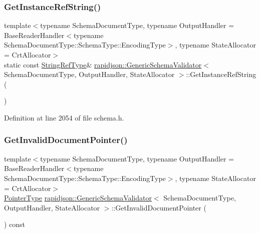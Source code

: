 \subsubsection{\texorpdfstring{GetInstanceRefString()}{GetInstanceRefString()}}
{\footnotesize\ttfamily template$<$typename Schema\+Document\+Type, typename Output\+Handler = Base\+Reader\+Handler$<$typename Schema\+Document\+Type\+::\+Schema\+Type\+::\+Encoding\+Type$>$, typename State\+Allocator = Crt\+Allocator$>$ \\
static const \mbox{\hyperlink{classrapidjson_1_1_generic_schema_validator_af6d33bab73e771af8c06f2b05e878350}{String\+Ref\+Type}}\& \mbox{\hyperlink{classrapidjson_1_1_generic_schema_validator}{rapidjson\+::\+Generic\+Schema\+Validator}}$<$ Schema\+Document\+Type, Output\+Handler, State\+Allocator $>$\+::Get\+Instance\+Ref\+String (\begin{DoxyParamCaption}{ }\end{DoxyParamCaption})\hspace{0.3cm}{\ttfamily [static]}}



Definition at line 2054 of file schema.\+h.

\mbox{\label{classrapidjson_1_1_generic_schema_validator_a60dfb4a89593c8d3ca4c89a6202feb52}} 
\subsubsection{\texorpdfstring{GetInvalidDocumentPointer()}{GetInvalidDocumentPointer()}}
{\footnotesize\ttfamily template$<$typename Schema\+Document\+Type, typename Output\+Handler = Base\+Reader\+Handler$<$typename Schema\+Document\+Type\+::\+Schema\+Type\+::\+Encoding\+Type$>$, typename State\+Allocator = Crt\+Allocator$>$ \\
\mbox{\hyperlink{classrapidjson_1_1_generic_schema_validator_aace9622f8ebac1c386081f6d1dcd774e}{Pointer\+Type}} \mbox{\hyperlink{classrapidjson_1_1_generic_schema_validator}{rapidjson\+::\+Generic\+Schema\+Validator}}$<$ Schema\+Document\+Type, Output\+Handler, State\+Allocator $>$\+::Get\+Invalid\+Document\+Pointer (\begin{DoxyParamCaption}{ }\end{DoxyParamCaption}) const}



